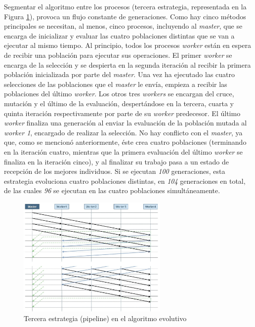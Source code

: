 	Segmentar el algoritmo entre los procesos (tercera estrategia, representada en la Figura \ref{fig:pev_mpi3}), provoca un flujo constante de generaciones. Como hay cinco métodos principales se necesitan, al menos, cinco procesos, incluyendo al \textit{master}, que se encarga de inicializar y evaluar las cuatro poblaciones distintas que se van a ejecutar al mismo tiempo. Al principio, todos los procesos \textit{worker} están en espera de recibir una población para ejecutar sus operaciones. El primer \textit{worker} se encarga de la selección y se despierta en la segunda iteración al recibir la primera población inicializada por parte del \textit{master}. Una vez ha ejecutado las cuatro selecciones de las poblaciones que el \textit{master} le envía, empieza a recibir las poblaciones del último \textit{worker}. Los otros tres \textit{workers} se encargan del cruce, mutación y el último de la evaluación, despertándose en la tercera, cuarta y quinta iteración respectivamente por parte de su \textit{worker} predecesor. El último \textit{worker} finaliza una generación al enviar la evaluación de la población mutada al \textit{worker 1}, encargado de realizar la selección. No hay conflicto con el \textit{master}, ya que, como se mencionó anteriormente, éste crea cuatro poblaciones (terminando en la iteración cuatro, mientras que la primera evaluación del último \textit{worker} se finaliza en la iteración cinco), y al finalizar su trabajo pasa a un estado de recepción de los mejores individuos. Si se ejecutan \textit{100} generaciones, esta estrategia evoluciona cuatro poblaciones distintas, en \textit{104} generaciones en total, de las cuales \textit{96} se ejecutan en las cuatro poblaciones simultáneamente.
	
	
		
	\begin{figure}[!h]
		\centering
		\includegraphics[width=0.65\textwidth]{images/chapter_3/pev_mpi3}
		\caption{Tercera estrategia (pipeline) en el algoritmo evolutivo }
		\label{fig:pev_mpi3}
	\end{figure}


